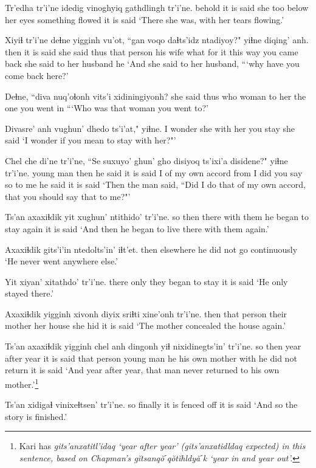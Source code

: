 \documentclass[12pt]{article}
\begin{document}
\gll Tr'edha tr'i'ne idedig vinoghyiq gathdlingh tr'i'ne.
behold  {it is said} {she too} {below her eyes} {something flowed} {it is said}
\glt `There she was, with her tears flowing.'
\glend

\gll Xiyiɬ tr'i'ne deɬne yigginh vu'ot, ``gan voqo daɬts'idz ntadiyoy?"  yiɬne  diqing' anh.
then {it is said} {she said thus} {that person} {his wife} what {for it} {this way} {you came back} {she said to} {her husband} he
\glt `And she said to her husband, ```why have you come back here?'
\glend

\gll Deɬne, ``diva nuq'oɬonh vits'i xidiningiyonh?
{she said thus} who woman  {to her}  {the one you went in}
\glt ```Who was that woman you went to?' 
\glend

\gll Divasre' anh vughun' dhedo ts'i'at," yiɬne.
{I wonder} she {with her} {you stay} {}  {she said}
\glt `I wonder if you mean to stay with her?"'
\glend

\gll Chel che di'ne tr'i'ne, ``Se {suxuyo' ghun'} gho disiyoq ts'ixi'a disidene?"  yiɬne tr'i'ne.
{young man} then {he said}  {it is said} I {of my own accord} from {I did} {}  {you say so to me} {he said} {it is said}
\glt `Then the man said, ``Did I do that of my own accord, that you should say that to me?"'
\glend

\gll Ts'an axaxiɬdik yit xughun' ntithido'  tr'i'ne.
so then  there {with them} {he began to stay again} {it is said}
\glt `And then he began to live there with them again.'
\glend

\gll Axaxiɬdik gits'i'in  ntedolts'in'  iɬt'et.
then  elsewhere {he did not go}  continuously
\glt `He never went anywhere else.'
\glend

\gll Yit xiyan' xitathdo' tr'i'ne.
there only  {they began to stay} {it is said}
\glt `He only stayed there.'
\glend

\gll Axaxiɬdik yigginh xivonh diyix  {sriɬti xine'onh} tr'i'ne.
then  {that person} {their mother} {her house} {she hid}  {it is said}
\glt `The mother concealed the house again.'
\glend

\gll Ts'an axaxiɬdik yigginh chel anh dingonh  yiɬ {nixidinegts'in'} tr'i'ne.
so then {year after year}  {it is said} {that person} {young man} he {his own mother} with {he did not return} {it is said}
\glt `And year after year, that man never returned to his own mother.'\footnote{Kari has \em gits'anxatitl'idaq \em `year after year' (\em gits'anxatidldaq \em expected) in this sentence, based on Chapman's \em g\u{i}tsanq\u{o}ˊq\u{o}t\u{i}hldy\u{a}ˊk \em `year in and year out'.}
\glend

\gll Ts'an xidigaɬ vinixeɬtsen'  tr'i'ne.
so finally  {it is fenced off}  {it is said}
\glt `And so the story is finished.'
\glend
\end{document}
